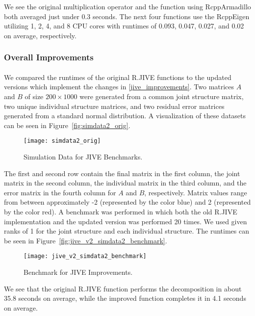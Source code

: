\documentclass[
12pt, %
letterpaper, %
oneside, %
headinclude,footinclude, %
BCOR5mm, %
]{scrartcl}
\begin{document}
We see the original multiplication operator and the function using RcppArmadillo both averaged just under 0.3 seconds. The next four functions use the RcppEigen utilizing 1, 2, 4, and 8 CPU cores with runtimes of 0.093, 0.047, 0.027, and 0.02 on average, respectively.

\subsubsection*{Overall Improvements}

\paragraph*{}
We compared the runtimes of the original R.JIVE functions to the updated versions which implement the changes in \ref{jive_improvements}. Two matrices $A$ and $B$ of size $200 \times 1000$ were generated from a common joint structure matrix, two unique individual structure matrices, and two residual error matrices generated from a standard normal distribution. A visualization of these datasets can be seen in Figure~\vref{fig:simdata2_orig}.

\begin{figure}[ht]
    \centering 
    \texttt{[image: simdata2\_orig]} 
    \caption[Simulation Data for JIVE Benchmarks]{Simulation Data for JIVE Benchmarks.}
    \label{fig:simdata2_orig} 
\end{figure}

The first and second row contain the final matrix in the first column, the joint matrix in the second column, the individual matrix in the third column, and the error matrix in the fourth column for $A$ and $B$, respectively. Matrix values range from between approximately -2 (represented by the color blue) and 2 (represented by the color red). A benchmark was performed in which both the old R.JIVE implementation and the updated version was performed 20 times. We used given ranks of 1 for the joint structure and each individual structure. The runtimes can be seen in Figure~\vref{fig:jive_v2_simdata2_benchmark}.

\begin{figure}[H]
    \centering 
    \texttt{[image: jive\_v2\_simdata2\_benchmark]} 
    \caption[Benchmark for JIVE Improvements]{Benchmark for JIVE Improvements.}
    \label{fig:jive_v2_simdata2_benchmark} 
\end{figure}

We see that the original R.JIVE function performs the decomposition in about 35.8 seconds on average, while the improved function completes it in 4.1 seconds on average.
\end{document}
